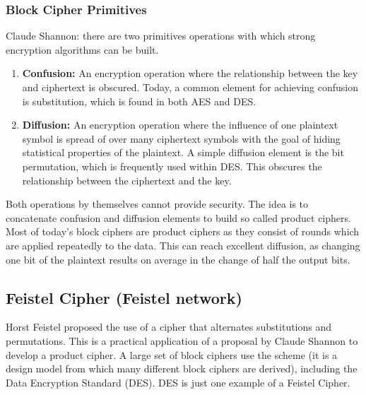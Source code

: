 \documentclass{math}
\begin{document}
\subsubsection*{Block Cipher Primitives}
Claude Shannon: there are two primitives operations with which strong encryption
algorithms can be built.
\begin{enumerate}
  \item \textbf{Confusion:} An encryption operation where the relationship
  between the key and ciphertext is obscured. Today, a common element for
  achieving confusion is substitution, which is found in both AES and DES.
  \item \textbf{Diffusion:} An encryption operation where the influence of one
  plaintext symbol is spread of over many ciphertext symbols with the goal of
  hiding statistical properties of the plaintext. A simple diffusion element is
  the bit permutation, which is frequently used within DES. This obscures the
  relationship between the ciphertext and the key.
\end{enumerate}
Both operations by themselves cannot provide security. The idea is to
concatenate confusion and diffusion elements to build so called product ciphers.
Most of today's block ciphers are product ciphers as they consist of rounds
which are applied repeatedly to the data. This can reach excellent diffusion, as
changing one bit of the plaintext results on average in the change of half the
output bits.

\subsection*{Feistel Cipher (Feistel network)}
Horst Feistel proposed the use of a cipher that alternates substitutions and
permutations. This is a practical application of a proposal by Claude Shannon to
develop a product cipher. A large set of block ciphers use the scheme (it is a
design model from which many different block ciphers are derived), including the
Data Encryption Standard (DES). DES is just one example of a Feistel Cipher.
\end{document}
